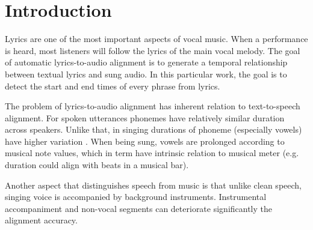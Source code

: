 \documentclass{article}
\title{\papertitle}
\begin{document}
%
\capstartfalse
\maketitle
\capstarttrue
%
\begin{abstract}
In this work we propose how to modify a standard approach to text-to-speech alignment
for solving the problem of alignment of lyrics and singing voice. To this end we model the duration of phonemes, specific to the case of singing.
We rely on a duration-explicit hidden Markov model (DHMM) phonetic
recognizer based on mel frequency cepstral coefficients
(MFCCs), which are extracted in a way robust to background instrumental sounds. The proposed approach is tested on polyphonic audio from the classical
Turkish music tradition in two settings: with and without modeling phoneme durations. Phoneme durations are inferred from sheet music.
In order to assess the impact of the polyphonic setting, alignment is evaluated as well on an acapella
dataset, compiled especially for this study. Results show that the explicit modeling of phoneme durations improves alignment
accuracy by absolute 10 percent on the level of lyrics lines (phrases). Comparison to
 state-of-the-art aligners for other languages indicates the potential of the proposed method.
\end{abstract}
%


\section{Introduction}

\label{sec:intro}
Lyrics are one of the most important aspects
of vocal music. When a performance is heard, most listeners
will follow the lyrics of the main vocal melody. The goal of automatic lyrics-to-audio alignment is to generate a temporal relationship between textual lyrics and sung audio. In this particular work, the goal is to detect the start and end times of every phrase from lyrics. 

The problem of lyrics-to-audio alignment has inherent relation to text-to-speech
alignment. For spoken utterances phonemes have relatively similar
duration across speakers. Unlike that, in singing durations of phoneme
(especially vowels) have higher variation \cite{kruspekeyword}. When
being sung, vowels are prolonged according to musical note values,
which in term have intrinsic relation to musical meter (e.g. duration
could align with beats in a musical bar). 

Another aspect that distinguishes speech from music is that unlike
clean speech, singing voice is accompanied by background instruments.
Instrumental accompaniment and non-vocal segments can deteriorate
significantly the alignment accuracy.
\end{document}
